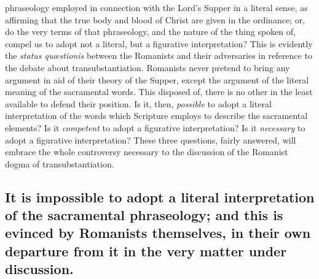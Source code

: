 \documentclass[english,]{book}
\begin{document}
phraseology employed in connection with the Lord's Supper in a literal sense, as affirming that the true body and blood of Christ are given in the ordinance; or, do the very terms of that phraseology, and the nature of the thing spoken of, compel us to adopt not a literal, but a figurative interpretation? This is evidently the \emph{status quœstionis} between the Romanists and their adversaries in reference to the debate about transubstantiation. Romanists never pretend to bring any argument in aid of their theory of the Supper, except the argument of the literal meaning of the sacramental words. This disposed of, there is no other in the least available to defend their position. Is it, then, \emph{possible} to adopt a literal interpretation of the words which Scripture employs to describe the sacramental elements? Is it \emph{competent} to adopt a figurative interpretation? Is it \emph{necessary} to adopt a figurative interpretation? These three questions, fairly answered, will embrace the whole controversy necessary to the discussion of the Romanist dogma of transubstantiation.

\hypertarget{it-is-impossible-to-adopt-a-literal-interpretation-of-the-sacramental-phraseology-and-this-is-evinced-by-romanists-themselves-in-their-own-departure-from-it-in-the-very-matter-under-discussion.}{%
\subsection{It is impossible to adopt a literal interpretation of the sacramental phraseology; and this is evinced by Romanists themselves, in their own departure from it in the very matter under discussion.}\label{it-is-impossible-to-adopt-a-literal-interpretation-of-the-sacramental-phraseology-and-this-is-evinced-by-romanists-themselves-in-their-own-departure-from-it-in-the-very-matter-under-discussion.}}
\end{document}
